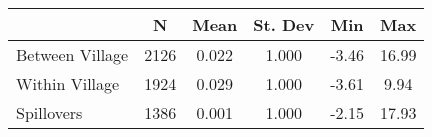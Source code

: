 \begin{tabular}{l*{5}{c}}\hline&\multicolumn{1}{c}{N}&\multicolumn{1}{c}{Mean}&\multicolumn{1}{c}{St. Dev}&\multicolumn{1}{c}{Min}&\multicolumn{1}{c}{Max}\\ \hline 
Between Village & 2126 & 0.022 & 1.000 & -3.46 & 16.99 \\
Within Village & 1924 & 0.029 & 1.000 & -3.61 & 9.94 \\
Spillovers & 1386 & 0.001 & 1.000 & -2.15 & 17.93 \\
\hline \end{tabular}
